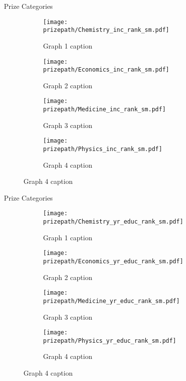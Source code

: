 \begin{frame}{Prize Categories}

\begin{figure}[ht]
\centering
\caption{Income Rankings}
\begin{subfigure}{0.45\textwidth}
\texttt{[image: \\prizepath/Chemistry\_inc\_rank\_sm.pdf]}
\caption{Graph 1 caption}
\end{subfigure}
\hfill
\begin{subfigure}{0.45\textwidth}
\texttt{[image: \\prizepath/Economics\_inc\_rank\_sm.pdf]}
\caption{Graph 2 caption}
\end{subfigure}

\begin{subfigure}{0.45\textwidth}
\texttt{[image: \\prizepath/Medicine\_inc\_rank\_sm.pdf]}
\caption{Graph 3 caption}
\end{subfigure}
\hfill
\begin{subfigure}{0.45\textwidth}
\texttt{[image: \\prizepath/Physics\_inc\_rank\_sm.pdf]}
\caption{Graph 4 caption}
\end{subfigure}
\end{figure}

\end{frame}

\begin{frame}{Prize Categories}

\begin{figure}[ht]
\centering
\caption{Education Rankings}
\begin{subfigure}{0.45\textwidth}
\texttt{[image: \\prizepath/Chemistry\_yr\_educ\_rank\_sm.pdf]}
\caption{Graph 1 caption}
\end{subfigure}
\hfill
\begin{subfigure}{0.45\textwidth}
\texttt{[image: \\prizepath/Economics\_yr\_educ\_rank\_sm.pdf]}
\caption{Graph 2 caption}
\end{subfigure}

\begin{subfigure}{0.45\textwidth}
\texttt{[image: \\prizepath/Medicine\_yr\_educ\_rank\_sm.pdf]}
\caption{Graph 3 caption}
\end{subfigure}
\hfill
\begin{subfigure}{0.45\textwidth}
\texttt{[image: \\prizepath/Physics\_yr\_educ\_rank\_sm.pdf]}
\caption{Graph 4 caption}
\end{subfigure}
\end{figure}
\end{frame}


